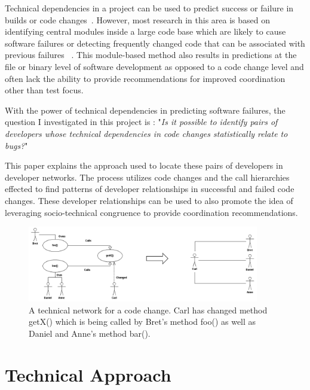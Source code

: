 \documentclass[conference]{IEEEtran}
\begin{document}
Technical dependencies in a project can be used to predict success or failure in
 builds or code changes~\cite{Pinzger:2008:DNP, Zimmermann:2008:PDU}. However, most 
research in this area is based on identifying
central modules inside a large code base which are likely to cause software failures or
detecting frequently changed code that can be associated with previous failures
~\cite{Kim:2006:AIB}. 
This module-based method also results in predictions 
at the file or binary level of software development as opposed to a code change level
and often lack the ability to provide recommendations for improved coordination
other than test focus.

With the power of technical dependencies in predicting software failures, the question I
investigated in this project is : 
"\textit{Is it possible to identify pairs of developers whose technical dependencies in code changes
statistically relate to bugs?}"

This paper explains the approach used to locate these pairs of developers in developer networks.
The process utilizes code changes and the call hierarchies effected  to find patterns of developer 
relationships in successful and failed code changes.  These developer relationships can be used
to also promote the idea of leveraging socio-technical congruence to provide coordination recommendations.

\begin{figure}[tb!]
\centering
\includegraphics[width=0.9\textwidth]{images/TecNetwork}
\caption{A technical network for a code change. Carl has changed method getX() which is being
called by Bret's method foo() as well as Daniel and Anne's method bar().\label{fig:network}}
\end{figure}

\section{Technical Approach}
\end{document}
